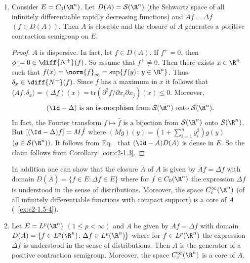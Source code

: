 \begin{examples}
\begin{enumerate}[\upshape (i), wide, labelindent=.25em]
\begin{proof}
We have shown that $A$ is dispersive. 
As in~\ref{ex:c2-1.5-1}   one shows that $(\Id - A)$ is surjective. 
Now the claim follows from Theorem~\ref{thm:c2-1.2}.
\end{proof}
\item \label{ex:c2-1.5-3} 
Consider $E = C_{0}(\R^{n})$. 
Let $D(A) = \mathcal{S}(\R^{n})$ (the Schwartz space of all infinitely differentiable rapidly decreasing functions) and $Af = \Delta f$ $(f \in D(A))$. 
Then $A$ is closable and the closure of\/ $A$ generates a positive contraction semigroup on $E$.
\begin{proof}
$A$ is dispersive. 
In fact, let $f \in D(A)$. 
If\/ $f^{+} = 0$, then $\phi \coloneqq 0 \in \diff{N^{+}}(f)$. 
So assume that $f^{+} \neq 0$. 
Then there exists $x \in \R^{n}$ such that $f(x) = \norm{f}_{\infty} = \sup\{f(y) \colon y \in \R^{n}\}$. 
Thus $\delta_{x} \in \diff{N^{+}}(f)$.
Since $f$ has a maximum in $x$ it follows that $\langle Af,\delta_{x} \rangle = (\Delta f)(x) = \text{tr}(\partial^{2}f/\partial x_{i}\partial x_{j})(x) \leq 0$. 
Moreover,
\begin{equation}\label{eq:c2-1.3}
(\Id - \Delta) \text{ is an isomorphism from } \mathcal{S}(\R^{n}) \text{ onto } \mathcal{S}(\R^{n}).
\end{equation}
In fact, the Fourier transform $f \mapsto \hat{f}$ is a bijection from $\mathcal{S}(\R^{n})$ onto $\mathcal{S}(\R^{n})$.
But $[(\Id - \Delta)f]^{\hat{}} = M\hat{f}$ where $(Mg)(y) = (1 + \sum_{i=1}^{n} y_{i}^{2})g(y)$ $(g \in \mathcal{S}(\R^{n}))$. It follows from Eq.~    that $(\Id - A)D(A)$ is dense in $E$. So the claim follows from Corollary~\ref{cor:c2-1.3}.
\end{proof}
\begin{remark*}\label{rem:c2-1.2}
%
In addition one can show that the closure $\overline{A}$ of\/ $A$ is given by $\overline{A}f = \Delta f$ with domain $D(\overline{A}) = \{f \in E \colon \Delta f \in E\}$ where for
$f \in C_{0}(\R^{n})$ the expression $\Delta f$ is understood in the sense of distributions. 
Moreover, the space $C_{c}^{\infty}(\R^{n})$ (of all infinitely differentiable functions with compact support) is a core of\/ $\overline{A}$ (\cf~\ref{ex:c2-1.5-4}).
\end{remark*}
\item \label{ex:c2-1.5-4} 
Let $E = L^{p}(\R^{n})$ $(1 \leq p < \infty)$ and $A$ be given by $Af = \Delta f$ with domain $D(A) = \{f \in L^{p}(\R^{n}) \colon \Delta f \in L^{p}(\R^{n})\}$ where for $f \in L^{p}(\R^{n})$ the expression $\Delta f$ is understood in the sense of distributions. Then $A$ is the generator of a positive contraction semigroup. Moreover, the space $C_{c}^{\infty}(\R^{n})$ is a core of\/ $A$.

\end{enumerate}
\end{examples}
